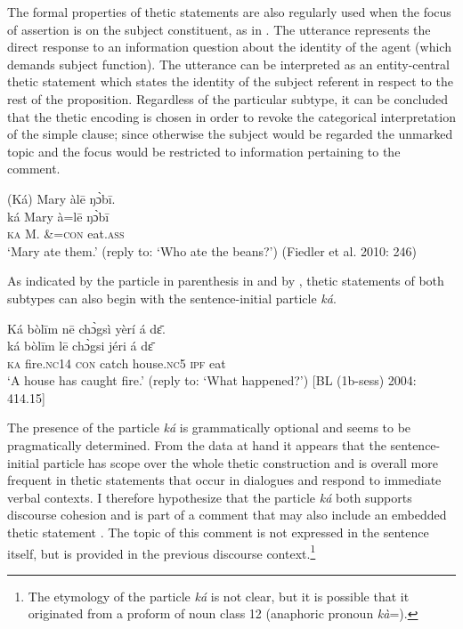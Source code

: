 \documentclass[output=paper]{langsci/langscibook}
\begin{document}
The formal properties of thetic statements are also regularly used when the focus of assertion is on the subject constituent, as in . The utterance represents the direct response to an information question about the identity of the agent (which demands subject function). The utterance can be interpreted as an entity-central thetic statement which states the identity of the subject referent in respect to the rest of the proposition. Regardless of the particular subtype, it can be concluded that the thetic encoding is chosen in order to revoke the categorical interpretation of the simple clause; since otherwise the subject would be regarded the unmarked topic and the focus would be restricted to information pertaining to the comment. 

\ea\label{ex:schwarz:25}
\glll  (Ká)  Mary  àl\={e}    ŋ\`ɔb\={i}.\\
    \textup{ká}  Mary  à=l\={e}    {ŋ\`ɔb\={i}}\\
     \textsc{ka}  M.  \&=\textsc{con}  eat.\textsc{ass}\\
\glt ‘Mary ate them.’ (reply to: ‘Who ate the beans?’) (Fiedler et al. 2010: 246)
\z

As indicated by the particle in parenthesis in  and by , thetic statements of both subtypes can also begin with the sentence-initial particle \textit{ká}. 

\ea\label{ex:schwarz:26}
\glll   Ká  bòl\={i}m    n\={e}  ch\`{ɔ}gsì  yèrí    á  d\={ɛ}.\\
    \textup{ká}  bòl\={i}m    l\={e}  ch\`{ɔ}gsi  jéri    á  d\={ɛ}\\
     \textsc{  ka}  fire.\textsc{nc}14  \textsc{con}  catch   house.\textsc{nc}5   \textsc{ipf}   eat\\
\glt ‘A house has caught fire.’ (reply to: ‘What happened?’) [BL (1b-sess) 2004: 414.15]
\z

The presence of the particle \textit{ká} is grammatically optional and seems to be pragmatically determined. From the data at hand it appears that the sentence-initial particle has scope over the whole thetic construction and is overall more frequent in thetic statements that occur in dialogues and respond to immediate verbal contexts. I therefore hypothesize that the particle \textit{ká} both supports discourse cohesion and is part of a comment that may also include an embedded thetic statement . The topic of this comment is not expressed in the sentence itself, but is provided in the previous discourse context.\footnote{The etymology of the particle \textit{ká} is not clear, but it is possible that it originated from a proform of noun class 12 (anaphoric pronoun \textit{kà}=).} 
\end{document}
